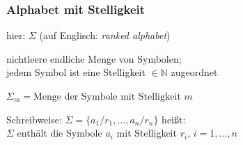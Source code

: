     \begin{frame}
      \frametitle{Alphabet mit Stelligkeit}
      
      \begin{Itemize}
        \item
          hier:  $\Sigma$
          \quad
          (auf Englisch: \emph{ranked alphabet})
        \item
          nichtleere endliche Menge von Symbolen;\\
          jedem Symbol ist eine Stelligkeit $\in \mathbb{N}$ zugeordnet
        \item
          $\Sigma_m = \text{Menge der Symbole mit Stelligkeit $m$}$
        \item
          Schreibweise: $\Sigma = \{a_1/r_1,\dots,a_n/r_n\}$ heißt:\\
          $\Sigma$ enthält die Symbole $a_i$ mit Stelligkeit $r_i$, $i=1,\dots,n$
      \end{Itemize}

      \par\bigskip

    \end{frame}

